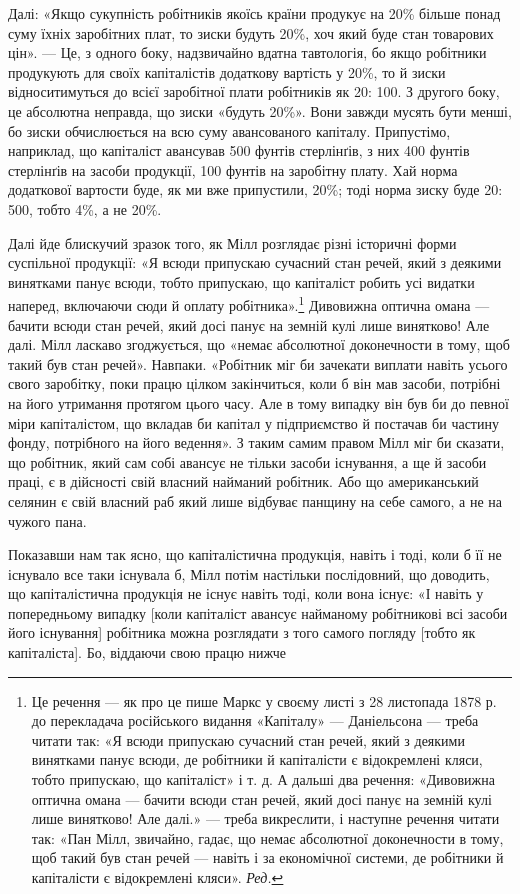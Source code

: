 Далі: «Якщо сукупність робітників якоїсь країни продукує
на 20\% більше понад суму їхніх заробітних плат, то зиски будуть
20\%, хоч який буде стан товарових цін». — Це, з одного
боку, надзвичайно вдатна тавтологія, бо якщо робітники продукують
для своїх капіталістів додаткову вартість у 20\%, то й зиски
відноситимуться до всієї заробітної плати робітників як 20: 100.
З другого боку, це абсолютна неправда, що зиски «будуть 20\%».
Вони завжди мусять бути менші, бо зиски обчислюється на всю
суму авансованого капіталу. Припустімо, наприклад, що капіталіст
авансував 500 фунтів стерлінґів, з них 400 фунтів стерлінґів
на засоби продукції, 100 фунтів на заробітну плату. Хай
норма додаткової вартости буде, як ми вже припустили, 20\%;
тоді норма зиску буде 20: 500, тобто 4\%, а не 20\%.

Далі йде блискучий зразок того, як Мілл розглядає різні
історичні форми суспільної продукції: «Я всюди припускаю
сучасний стан речей, який з деякими винятками панує всюди,
тобто припускаю, що капіталіст робить усі видатки наперед,
включаючи сюди й оплату робітника».\footnote*{
Це речення — як про це пише Маркс у своєму листі з 28 листопада
1878 р. до перекладача російського видання «Капіталу» — Даніельсона —
треба читати так: «Я всюди припускаю сучасний стан речей, який з деякими
винятками панує всюди, де робітники й капіталісти є відокремлені
кляси, тобто припускаю, що капіталіст» і т. д. А дальші два речення:
«Дивовижна оптична омана — бачити всюди стан речей, який досі
панує на земній кулі лише винятково! Але далі.» — треба викреслити, і
наступне речення читати так: «Пан Мілл, звичайно, гадає, що немає
абсолютної доконечности в тому, щоб такий був стан речей — навіть
і за економічної системи, де робітники й капіталісти є відокремлені
кляси». \emph{Ред.}
} Дивовижна оптична
омана — бачити всюди стан речей, який досі панує на земній
кулі лише винятково! Але далі. Мілл ласкаво згоджується, що
«немає абсолютної доконечности в тому, щоб такий був стан
речей». Навпаки. «Робітник міг би зачекати виплати навіть
усього свого заробітку, поки працю цілком закінчиться, коли б
він мав засоби, потрібні на його утримання протягом цього часу.
Але в тому випадку він був би до певної міри капіталістом, що
вкладав би капітал у підприємство й постачав би частину фонду,
потрібного на його ведення». З таким самим правом Мілл міг би
сказати, що робітник, який сам собі авансує не тільки засоби
існування, а ще й засоби праці, є в дійсності свій власний найманий
робітник. Або що американський селянин є свій власний
раб який лише відбуває панщину на себе самого, а не на чужого
пана.

Показавши нам так ясно, що капіталістична продукція, навіть
і тоді, коли б її не існувало все таки існувала б, Мілл потім
настільки послідовний, що доводить, що капіталістична продукція
не існує навіть тоді, коли вона існує: «І навіть у попередньому
випадку [коли капіталіст авансує найманому робітникові всі
засоби його існування] робітника можна розглядати з того самого
погляду [тобто як капіталіста]. Бо, віддаючи свою працю нижче
